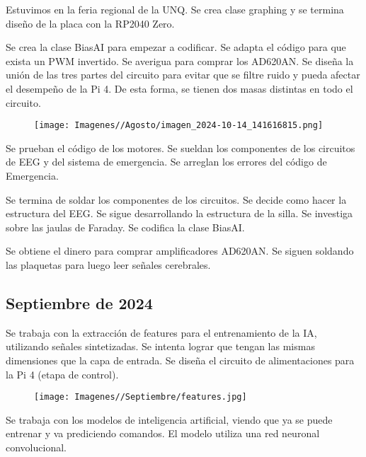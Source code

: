 \documentclass{article}
\begin{document}
Estuvimos en la feria regional de la UNQ. Se crea clase graphing y se termina diseño de la placa con la RP2040 Zero. 



Se crea la clase BiasAI para empezar a codificar. Se adapta el código para que exista un PWM invertido. Se averigua para comprar los AD620AN. Se diseña la unión de las tres partes del circuito para evitar que se filtre ruido y pueda afectar el desempeño de la Pi 4. De esta forma, se tienen dos masas distintas en todo el circuito.

\begin{figure}[H]
    \centering
    \texttt{[image: Imagenes//Agosto/imagen\_2024-10-14\_141616815.png]}
\end{figure}

Se prueban el código de los motores. Se sueldan los componentes de los circuitos de EEG y del sistema de emergencia. Se arreglan los errores del código de Emergencia.



Se termina de soldar los componentes de los circuitos. Se decide como hacer la estructura del EEG. Se sigue desarrollando la estructura de la silla. Se investiga sobre las jaulas de Faraday. Se codifica la clase BiasAI. 



Se obtiene el dinero para comprar amplificadores AD620AN. Se siguen soldando las plaquetas para luego leer señales cerebrales.

\newpage

\begin{center}
    \section{Septiembre de 2024}
\end{center}


Se trabaja con la extracción de features para el entrenamiento de la IA, utilizando señales sintetizadas. Se intenta lograr que tengan las mismas dimensiones que la capa de entrada. Se diseña el circuito de alimentaciones para la Pi 4 (etapa de control).

\begin{figure}[H]
    \centering
    \texttt{[image: Imagenes//Septiembre/features.jpg]}
\end{figure}

Se trabaja con los modelos de inteligencia artificial, viendo que ya se puede entrenar y va prediciendo comandos. El modelo utiliza una red neuronal convolucional.
\end{document}
